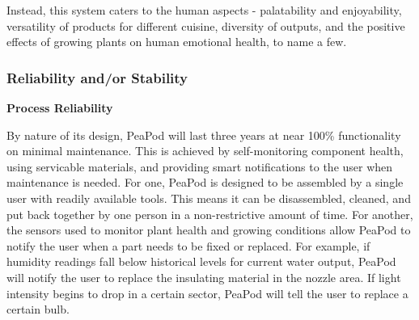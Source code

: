 \documentclass{report}
\begin{document}
Instead, this system caters to the human aspects - palatability and enjoyability, versatility of products for different cuisine, diversity of outputs, and the positive effects of growing plants on human emotional health, to name a few.


\newpage

\subsubsection{Reliability and/or Stability}

\textbf{Process Reliability}






By nature of its design, PeaPod will last three years at near 100\% functionality on minimal maintenance.
This is achieved by self-monitoring component health, using servicable materials, and providing smart notifications to the user when maintenance is needed.
For one, PeaPod is designed to be assembled by a single user with readily available tools. This means it can be disassembled, cleaned, and put back together by one person in a non-restrictive amount of time.
For another, the sensors used to monitor plant health and growing conditions allow PeaPod to notify the user when a part needs to be fixed or replaced. For example, if humidity readings fall below historical levels for current water output, PeaPod will notify the user to replace the insulating material in the nozzle area. If light intensity begins to drop in a certain sector, PeaPod will tell the user to replace a certain bulb.
\end{document}
